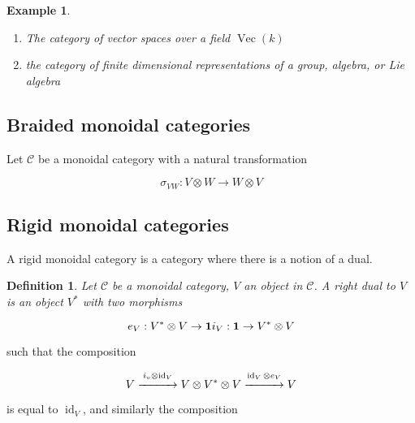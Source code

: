 \documentclass[]{article}
\newtheorem{defn}{Definition}
\newtheorem{example}{Example}
\newcommand{\id}{\operatorname{id}}
\begin{document}
\begin{example}
    \begin{enumerate}
    \renewcommand{\labelenumi}{\roman{enumi}}
        \item The category of vector spaces over a field $\operatorname{Vec}(k)$
        \item the category of finite dimensional representations of a group, algebra, or Lie algebra
    \end{enumerate}
\end{example}
    
\subsection{Braided monoidal categories}

Let $\mathcal{C}$ be a monoidal category with a natural transformation 

\begin{equation}
    \sigma_{VW} : V \otimes W \to W \otimes V
\end{equation}

\subsection{Rigid monoidal categories}
A rigid monoidal category is a category where there is a notion of a dual. 

\begin{defn}
    Let $\mathcal{C}$ be a monoidal category, $V$ an object in $\mathcal{C}$. A \emph{right dual} to $V$ is an object $V^*$ with two morphisms

    \begin{equation}
        e_V: V^* \otimes V \to \mathbf{1} \\
        i_V: \mathbf{1} \to V^* \otimes V
    \end{equation}
\end{defn}

such that the composition

\begin{equation}
    V \stackrel{i_v \otimes \id_V}{\xrightarrow{\hspace*{1cm}}} V \otimes V^*
    \otimes V  \stackrel{\id_V \otimes e_V}{\xrightarrow{\hspace*{1cm}}} V
\end{equation}

is equal to $\id_V$, and similarly the composition
\end{document}
